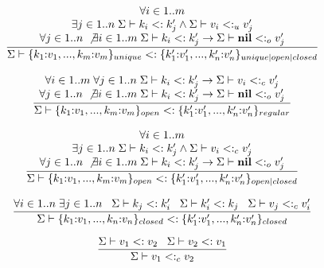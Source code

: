\[
\dfrac{\begin{array}{c}
       \forall i \in 1..m \\
       \exists j \in 1..n \;
       \Sigma \vdash k_{i} <: k_{j}' \land \Sigma \vdash v_{i} <:_{u} v_{j}' \\
       \forall j \in 1..n \; \not\exists i \in 1..m \;
       \Sigma \vdash k_{i} <: k_{j}' \to \Sigma \vdash \mathbf{nil} <:_{o} v_{j}'
       \end{array}}
      {\Sigma \vdash \{k_{1}{:}v_{1}, ..., k_{m}{:}v_{m}\}_{unique} <:
                    \{k_{1}'{:}v_{1}', ..., k_{n}'{:}v_{n}'\}_{unique|open|closed}}
\]

\[
\dfrac{\begin{array}{c}
       \forall i \in 1..m \; \forall j \in 1..n \;
       \Sigma \vdash k_{i} <: k_{j}' \to \Sigma \vdash v_{i} <:_{c} v_{j}' \\
       \forall j \in 1..n \; \not\exists i \in 1..m \;
       \Sigma \vdash k_{i} <: k_{j}' \to \Sigma \vdash \mathbf{nil} <:_{o} v_{j}'
       \end{array}}
      {\Sigma \vdash \{k_{1}{:}v_{1}, ..., k_{m}{:}v_{m}\}_{open} <:
                    \{k_{1}'{:}v_{1}', ..., k_{n}'{:}v_{n}'\}_{regular}}
\]

\[
\dfrac{\begin{array}{c}
       \forall i \in 1..m \\
       \exists j \in 1..n \;
       \Sigma \vdash k_{i} <: k_{j}' \land \Sigma \vdash v_{i} <:_{c} v_{j}' \\
       \forall j \in 1..n \; \not\exists i \in 1..m \;
       \Sigma \vdash k_{i} <: k_{j}' \to \Sigma \vdash \mathbf{nil} <:_{o} v_{j}'
       \end{array}}
      {\Sigma \vdash \{k_{1}{:}v_{1}, ..., k_{m}{:}v_{m}\}_{open} <:
                    \{k_{1}'{:}v_{1}', ..., k_{n}'{:}v_{n}'\}_{open|closed}}
\]

\[
\dfrac{\forall i \in 1..n \; \exists j \in 1..n \;\;\;
       \Sigma \vdash k_{j} <: k_{i}' \;\;\;
       \Sigma \vdash k_{i}' <: k_{j} \;\;\;
       \Sigma \vdash v_{j} <:_{c} v_{i}'}
      {\Sigma \vdash \{k_{1}{:}v_{1}, ..., k_{n}{:}v_{n}\}_{closed} <: \{k_{1}'{:}v_{1}', ..., k_{n}'{:}v_{n}'\}_{closed}}
\]

\[
\dfrac{\Sigma \vdash v_{1} <: v_{2} \;\;\;
       \Sigma \vdash v_{2} <: v_{1}}
      {\Sigma \vdash v_{1} <:_{c} v_{2}}
\]

